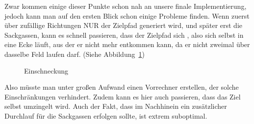 Zwar kommen einige dieser Punkte schon nah an unsere finale Implementierung, jedoch kann man auf den ersten Blick schon einige Probleme finden. Wenn zuerst über zufällige Richtungen NUR der Zielpfad generiert wird, und später erst die Sackgassen, kann es schnell passieren, dass der Zielpfad sich , also sich selbst in eine Ecke läuft, aus der er nicht mehr entkommen kann, da er nicht zweimal über dasselbe Feld laufen darf. (Siehe Abbildung~\ref{fig:einschnecken})
    \begin{figure}[ht!]
    \centering

        \caption{Einschneckung}
        \label{fig:einschnecken}
    \end{figure}

Also müsste man unter großen Aufwand einen Vorrechner erstellen, der solche Einschränkungen verhindert.
Zudem kann es hier auch passieren, dass das Ziel selbst umzingelt wird. Auch der Fakt, dass im Nachhinein ein zusätzlicher Durchlauf für die Sackgassen erfolgen sollte, ist extrem suboptimal.

